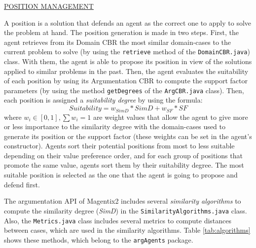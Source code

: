 \underline{POSITION MANAGEMENT}

A position is a solution that defends an agent as the correct one to apply to solve the problem at hand. The position generation is made in two steps. First, the agent retrieves from its Domain CBR the most similar domain-cases to the current problem to solve (by using the \texttt{retrieve} method of the \lstinline{DomainCBR.java}) class. With them, the agent is able to propose its position in view of the solutions applied to similar problems in the past. Then, the agent evaluates the suitability of each position by using its Argumentation CBR to compute the support factor parameters (by using the method \texttt{getDegrees} of the \lstinline{ArgCBR.java} class). Then, each position is assigned a \emph{suitability degree} by using the formula:
\begin{equation}
 Suitability = w_{SimD} * SimD + w_{SF} * SF
\end{equation}
where $w_i \in [0, 1], \sum w_i = 1$ are weight values that allow the agent to give more or less importance to the similarity degree with the domain-cases used to generate its position or the support factor (these weights can be set in the agent's constructor). Agents sort their potential positions from most to less suitable depending on their value preference order, and for each group of positions that promote the same value, agents sort them by their suitability degree. The most suitable position is selected as the one that the agent is going to propose and defend first.

The argumentation API of Magentix2 includes several \emph{similarity algorithms} to compute the similarity degree (\emph{SimD}) in the \lstinline{SimilarityAlgorithms.java} class. Also, the \lstinline{Metrics.java} class includes several metrics to compute distances between cases, which are used in the similarity algorithms. Table \ref{tab:algorithms} shows these methods, which belong to the \texttt{argAgents} package.

